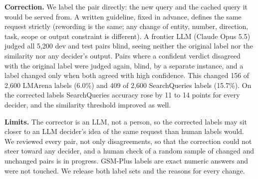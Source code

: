 \textbf{Correction.} We label the pair directly: the new query and the cached query it would be served from.
A written guideline, fixed in advance, defines the same request strictly (rewording is the same; any change of entity, number, direction, task, scope or output constraint is different).
A frontier LLM (Claude Opus 5.5) judged all 5,200 dev and test pairs blind, seeing neither the original label nor the similarity nor any decider's output.
Pairs where a confident verdict disagreed with the original label were judged again, blind, by a separate instance, and a label changed only when both agreed with high confidence.
This changed 156 of 2,600 LMArena labels (6.0\%) and 409 of 2,600 SearchQueries labels (15.7\%).
On the corrected labels SearchQueries accuracy rose by 11 to 14 points for every decider, and the similarity threshold improved as well.

\textbf{Limits.} The corrector is an LLM, not a person, so the corrected labels may sit closer to an LLM decider's idea of the same request than human labels would.
We reviewed every pair, not only disagreements, so that the correction could not steer toward any decider, and a human check of a random sample of changed and unchanged pairs is in progress.
GSM-Plus labels are exact numeric answers and were not touched.
We release both label sets and the reasons for every change.
